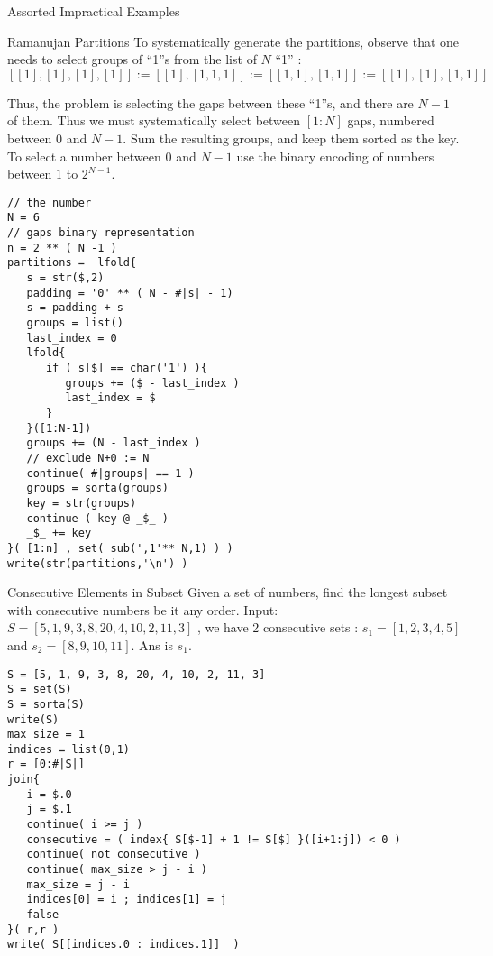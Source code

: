 \begin{section}{Assorted Impractical Examples}
\begin{subsection}{Ramanujan Partitions}
To systematically generate the partitions, observe that one needs to select groups of ``1''s from the list of $N$ ``1'' :
$$
[[1],[1],[1],[1]] := [ [1],[1,1,1] ] := [[1,1] ,[1,1] ] := [[1],[1],[1,1] ]
$$

Thus, the problem is selecting the gaps between these ``1''s, and there are $N-1$ of them.
Thus we must systematically select between $[1:N]$ gaps, numbered between $0$ and $N-1$. 
Sum the resulting groups, and keep them sorted as the key. To select a number between $0$ and $N-1$
use the binary encoding of numbers between $1$ to $2^{N-1}$.

\begin{center}\begin{minipage}{\linewidth}
\begin{lstlisting}[style=JexlStyle]
// the number
N = 6
// gaps binary representation  
n = 2 ** ( N -1 ) 
partitions =  lfold{
   s = str($,2)
   padding = '0' ** ( N - #|s| - 1)
   s = padding + s
   groups = list() 
   last_index = 0
   lfold{
      if ( s[$] == char('1') ){
         groups += ($ - last_index )
         last_index = $ 
      }
   }([1:N-1]) 
   groups += (N - last_index )
   // exclude N+0 := N 
   continue( #|groups| == 1 )
   groups = sorta(groups)
   key = str(groups)
   continue ( key @ _$_ )
   _$_ += key 
}( [1:n] , set( sub(',1'** N,1) ) )
write(str(partitions,'\n') )
\end{lstlisting}  
\end{minipage}\end{center}

\end{subsection}

\begin{subsection}{Consecutive Elements in Subset}
Given a set of numbers, find the longest subset with consecutive numbers be it any order. 
Input: $S = [ 5, 1, 9, 3, 8, 20, 4, 10, 2, 11, 3] $ ,
we have 2 consecutive sets : $s_1 = [1, 2, 3, 4, 5]$ and
$s_2 = [ 8, 9, 10, 11]$. Ans is $s_1$.

\begin{center}\begin{minipage}{\linewidth}
\begin{lstlisting}[style=JexlStyle]
S = [5, 1, 9, 3, 8, 20, 4, 10, 2, 11, 3]
S = set(S)
S = sorta(S)
write(S)
max_size = 1
indices = list(0,1)
r = [0:#|S|]
join{
   i = $.0 
   j = $.1 
   continue( i >= j )
   consecutive = ( index{ S[$-1] + 1 != S[$] }([i+1:j]) < 0 )
   continue( not consecutive )
   continue( max_size > j - i )
   max_size = j - i   
   indices[0] = i ; indices[1] = j 
   false
}( r,r )
write( S[[indices.0 : indices.1]]  )
\end{lstlisting}  
\end{minipage}\end{center} 
\end{subsection}


\end{section}
